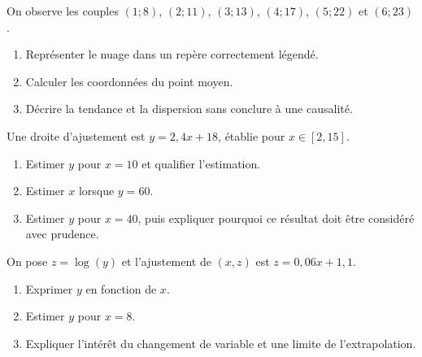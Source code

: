\begin{exercice}
On observe les couples $(1;8)$, $(2;11)$, $(3;13)$, $(4;17)$, $(5;22)$ et $(6;23)$.
\begin{enumerate}
\item Représenter le nuage dans un repère correctement légendé.
\item Calculer les coordonnées du point moyen.
\item Décrire la tendance et la dispersion sans conclure à une causalité.
\end{enumerate}
\end{exercice}
\begin{exercice}
Une droite d'ajustement est $y=2{,}4x+18$, établie pour $x\in[2,15]$.
\begin{enumerate}
\item Estimer $y$ pour $x=10$ et qualifier l'estimation.
\item Estimer $x$ lorsque $y=60$.
\item Estimer $y$ pour $x=40$, puis expliquer pourquoi ce résultat doit être considéré avec prudence.
\end{enumerate}
\end{exercice}
\begin{exercice}
On pose $z=\log(y)$ et l'ajustement de $(x,z)$ est $z=0{,}06x+1{,}1$.
\begin{enumerate}
\item Exprimer $y$ en fonction de $x$.
\item Estimer $y$ pour $x=8$.
\item Expliquer l'intérêt du changement de variable et une limite de l'extrapolation.
\end{enumerate}
\end{exercice}

